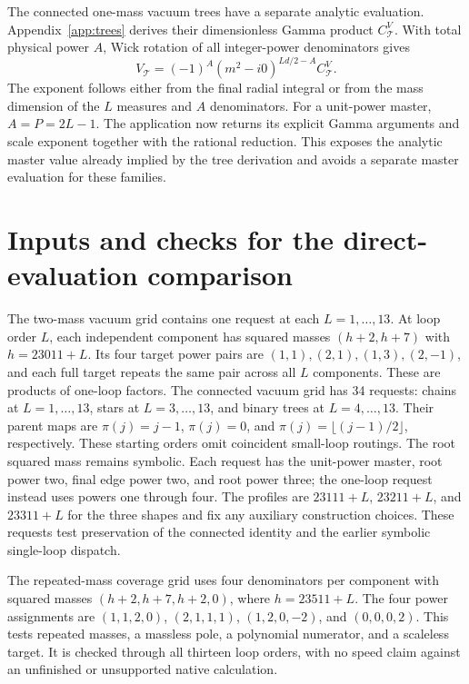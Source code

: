 The connected one-mass vacuum trees have a separate analytic evaluation. Appendix~\ref{app:trees} derives their dimensionless Gamma product $C^V_{\mathcal T}$. With total physical power $A$, Wick rotation of all integer-power denominators gives
\begin{equation}
 V_{\mathcal T}=(-1)^A(m^2-i0)^{Ld/2-A}C^V_{\mathcal T}.
 \label{eq:direct-tree-value}
\end{equation}
The exponent follows either from the final radial integral or from the mass dimension of the $L$ measures and $A$ denominators. For a unit-power master, $A=P=2L-1$. The application now returns its explicit Gamma arguments and scale exponent together with the rational reduction. This exposes the analytic master value already implied by the tree derivation and avoids a separate master evaluation for these families.

\section{Inputs and checks for the direct-evaluation comparison}
\label{app:direct-inputs}
The two-mass vacuum grid contains one request at each $L=1,\ldots,13$. At loop order $L$, each independent component has squared masses $(h+2,h+7)$ with $h=23011+L$. Its four target power pairs are $(1,1),(2,1),(1,3),(2,-1)$, and each full target repeats the same pair across all $L$ components. These are products of one-loop factors. The connected vacuum grid has 34 requests: chains at $L=1,\ldots,13$, stars at $L=3,\ldots,13$, and binary trees at $L=4,\ldots,13$. Their parent maps are $\pi(j)=j-1$, $\pi(j)=0$, and $\pi(j)=\lfloor(j-1)/2\rfloor$, respectively. These starting orders omit coincident small-loop routings. The root squared mass remains symbolic. Each request has the unit-power master, root power two, final edge power two, and root power three; the one-loop request instead uses powers one through four. The profiles are $23111+L$, $23211+L$, and $23311+L$ for the three shapes and fix any auxiliary construction choices. These requests test preservation of the connected identity and the earlier symbolic single-loop dispatch.

The repeated-mass coverage grid uses four denominators per component with squared masses $(h+2,h+7,h+2,0)$, where $h=23511+L$. The four power assignments are $(1,1,2,0)$, $(2,1,1,1)$, $(1,2,0,-2)$, and $(0,0,0,2)$. This tests repeated masses, a massless pole, a polynomial numerator, and a scaleless target. It is checked through all thirteen loop orders, with no speed claim against an unfinished or unsupported native calculation.

